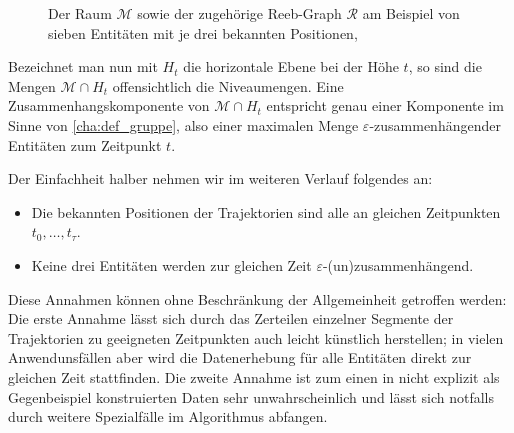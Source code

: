 \begin{figure}
	\Centering
	\hspace{1em}
	\caption{Der Raum $\mathcal{M}$ sowie der zugehörige Reeb-Graph $\mathcal{R}$ am Beispiel von sieben Entitäten mit je drei bekannten Positionen, \cite[Fig.~2]{buchin2015}}
\end{figure}

Bezeichnet man nun mit $H_t$ die horizontale Ebene bei der Höhe $t$, so sind die Mengen $\mathcal{M} \cap H_t$ offensichtlich die Niveaumengen.
Eine Zusammenhangskomponente von $\mathcal{M} \cap H_t$ entspricht genau einer Komponente im Sinne von \cref{cha:def_gruppe}, also einer maximalen Menge $\varepsilon$-zusammenhängender Entitäten zum Zeitpunkt $t$.

Der Einfachheit halber nehmen wir im weiteren Verlauf folgendes an:
\begin{itemize}
	\item Die bekannten Positionen der Trajektorien sind alle an gleichen Zeitpunkten $t_0, \ldots ,t_\tau$.
	\item Keine drei Entitäten werden zur gleichen Zeit $\varepsilon$-(un)zusammenhängend.
\end{itemize}
Diese Annahmen können ohne Beschränkung der Allgemeinheit getroffen werden:
Die erste Annahme lässt sich durch das Zerteilen einzelner Segmente der Trajektorien zu geeigneten Zeitpunkten auch leicht künstlich herstellen; in vielen Anwendunsfällen aber wird die Datenerhebung für alle Entitäten direkt zur gleichen Zeit stattfinden.
Die zweite Annahme ist zum einen in nicht explizit als Gegenbeispiel konstruierten Daten sehr unwahrscheinlich und lässt sich notfalls durch weitere Spezialfälle im Algorithmus abfangen.

